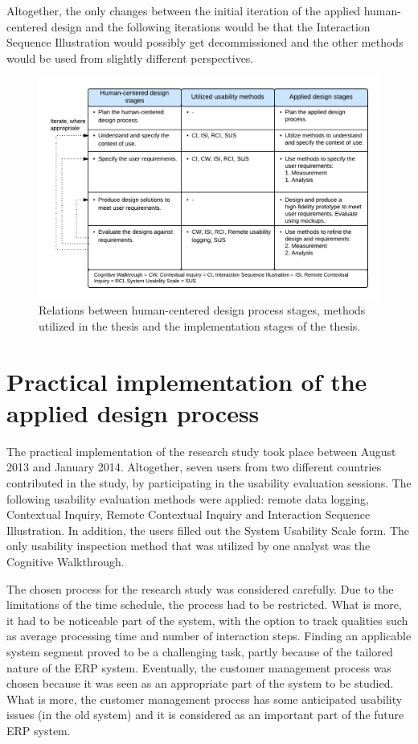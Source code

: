 \documentclass[12pt,a4paper,oneside,pdftex]{report}
\begin{document}
Altogether, the only changes between the initial iteration of the applied human-centered design and the following iterations would be that the Interaction Sequence Illustration would possibly get decommissioned and the other methods would be used from slightly different perspectives. 

\begin{figure}[H]
  	\centerline{
    	\includegraphics[width=1.3\textwidth]{./images/applied_hcd_process.png}
    	}
  	\caption{Relations between human-centered design process stages, methods utilized in the thesis and the implementation stages of the thesis.}
	\label{fig:hcd_process}
\end{figure}



\section{Practical implementation of the applied design process}
 \label{sec:implementation}

    
The practical implementation of the research study took place between August 2013 and January 2014. Altogether, seven users from two different countries contributed in the study, by participating in the usability evaluation sessions. The following usability evaluation methods were applied: remote data logging, Contextual Inquiry, Remote Contextual Inquiry and Interaction Sequence Illustration. In addition, the users filled out the System Usability Scale form. The only usability inspection method that was utilized by one analyst was the Cognitive Walkthrough.

The chosen process for the research study was considered carefully. Due to the limitations of the time schedule, the process had to be restricted. What is more, it had to be noticeable part of the system, with the option to track qualities such as average processing time and number of interaction steps. Finding an applicable system segment proved to be a challenging task, partly because of the tailored nature of the ERP system. Eventually, the customer management process was chosen because it was seen as an appropriate part of the system to be studied. What is more, the customer management process has some anticipated usability issues (in the old system) and it is considered as an important part of the future ERP system.
\end{document}
